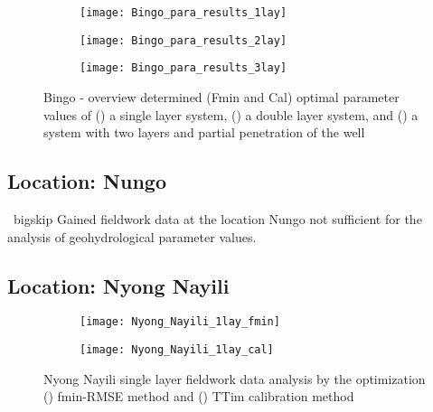 \clearpage

\begin{figure}[h!]
	\centering
	\begin{subfigure}[b]{\linewidth}
		\centering\texttt{[image: Bingo\_para\_results\_1lay]}
		\captionsetup{justification=centering}		
		\caption{\label{fig:Bingo_para_results_1lay}}
		\end{subfigure}\vfill
	\begin{subfigure}[b]{\linewidth}
		\centering\texttt{[image: Bingo\_para\_results\_2lay]}
		\captionsetup{justification=centering}		
		\caption{\label{fig:Bingo_para_results_2lay}}
		\end{subfigure}
	\begin{subfigure}[b]{\linewidth}
		\centering\texttt{[image: Bingo\_para\_results\_3lay]}
		\captionsetup{justification=centering}		
		\caption{\label{fig:Bingo_para_results_3lay}}
		\end{subfigure}		
	\captionsetup{justification=centering}	
	\caption{Bingo - overview determined (Fmin and Cal) optimal parameter values of () a single layer system, () a double layer system, and () a system with two layers and partial penetration of the well} 
	\label{fig:Bingo_para_results}
\end{figure} 


\clearpage\subsection{Location: Nungo}
\label{subsec:Nungo_overview}
\ bigskip 
Gained fieldwork data at the location Nungo not sufficient for the analysis of geohydrological parameter values.  

\clearpage\subsection{Location: Nyong Nayili}
\label{subsec:Nyong_Nayili_overview}

\begin{figure}[h!]
	\centering
	\begin{subfigure}[b]{0.65\linewidth}
		\centering\texttt{[image: Nyong\_Nayili\_1lay\_fmin]}
		\captionsetup{justification=centering}		
		\caption{\label{fig:Nyong_Nayili_1lay_fmin}}
		\end{subfigure}\vfill
	\begin{subfigure}[b]{0.65\linewidth}
		\centering\texttt{[image: Nyong\_Nayili\_1lay\_cal]}
		\captionsetup{justification=centering}		
		\caption{\label{fig:Nyong_Nayili_1lay_cal}}
		\end{subfigure}
	\captionsetup{justification=centering}	
	\caption{Nyong Nayili single layer fieldwork data analysis by the optimization () fmin-RMSE method and () TTim calibration method} 
	\label{fig:Nyong_Nayili_1lay_analysis}
\end{figure} 

